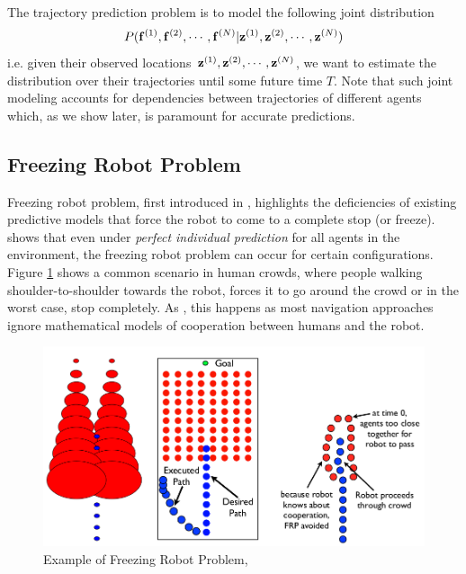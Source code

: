 The trajectory prediction problem is to model the following joint distribution
\begin{equation}
  \label{eq:traj-prediction-problem}
  P(\mathbf{f}^{(1)}, \mathbf{f}^{(2)}, \cdots, \mathbf{f}^{(N)} | \mathbf{z}^{(1)}, \mathbf{z}^{(2)}, \cdots, \mathbf{z}^{(N)})
\end{equation}
i.e. given their observed locations $\mathbf{z}^{(1)}, \mathbf{z}^{(2)}, \cdots, \mathbf{z}^{(N)}$, we want to estimate the distribution over their trajectories until some future time $T$. Note that such joint modeling accounts for dependencies between trajectories of different agents which, as we show later, is paramount for accurate predictions.

\subsection{Freezing Robot Problem}
\label{sec:intro-plann-as-infer}

Freezing robot problem, first introduced in \cite{trautman10}, highlights the deficiencies of existing predictive models that force the robot to come to a complete stop (or freeze). \cite{trautman10} shows that even under \textit{perfect individual prediction} for all agents in the environment, the freezing robot problem can occur for certain configurations. Figure \ref{fig:intro-freeze} shows a common scenario in human crowds, where people walking shoulder-to-shoulder towards the robot, forces it to go around the crowd or in the worst case, stop completely. As \cite{trautman10}, this happens as most navigation approaches ignore mathematical models of cooperation between humans and the robot.

\begin{figure}
  \centering
  \includegraphics[width=\linewidth]{Figures/frp.png}
  \caption{Example of Freezing Robot Problem, \cite{trautman10}}
  \label{fig:intro-freeze}
\end{figure}


